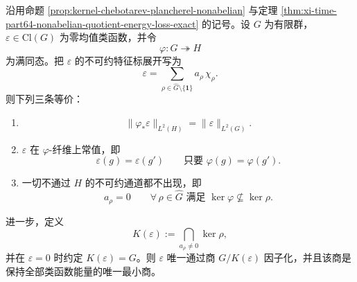 \begin{theorem}\label{thm:xi-time-part64aa-nonabelian-equality-criterion-minimal-class-quotient}
沿用命题 \ref{prop:kernel-chebotarev-plancherel-nonabelian} 与定理 \ref{thm:xi-time-part64-nonabelian-quotient-energy-loss-exact} 的记号。设 \(G\) 为有限群，\(\varepsilon\in\mathrm{Cl}(G)\) 为零均值类函数，并令
\[
\varphi:G\twoheadrightarrow H
\]
为满同态。把 \(\varepsilon\) 的不可约特征标展开写为
\[
\varepsilon=\sum_{\rho\in\widehat G\setminus\{\mathbf 1\}} a_\rho\,\chi_\rho.
\]
则下列三条等价：
\begin{enumerate}
  \item
  \[
  \boxed{\;
  \|\varphi_\ast\varepsilon\|_{L^2(H)}
  =
  \|\varepsilon\|_{L^2(G)}.\;}
  \]
  \item \(\varepsilon\) 在 \(\varphi\)-纤维上常值，即
  \[
  \boxed{\;
  \varepsilon(g)=\varepsilon(g')
  \qquad
  \text{只要 }\varphi(g)=\varphi(g').\;}
  \]
  \item 一切不通过 \(H\) 的不可约通道都不出现，即
  \[
  \boxed{\;
  a_\rho=0
  \qquad
  \forall\,\rho\in\widehat G
  \text{ 满足 }
  \ker\varphi\nsubseteq \ker\rho.\;}
  \]
\end{enumerate}

进一步，定义
\[
K(\varepsilon)
:=
\bigcap_{a_\rho\neq 0}\ker\rho,
\]
并在 \(\varepsilon=0\) 时约定 \(K(\varepsilon)=G\)。则 \(\varepsilon\) 唯一通过商 \(G/K(\varepsilon)\) 因子化，并且该商是保持全部类函数能量的唯一最小商。
\end{theorem}
